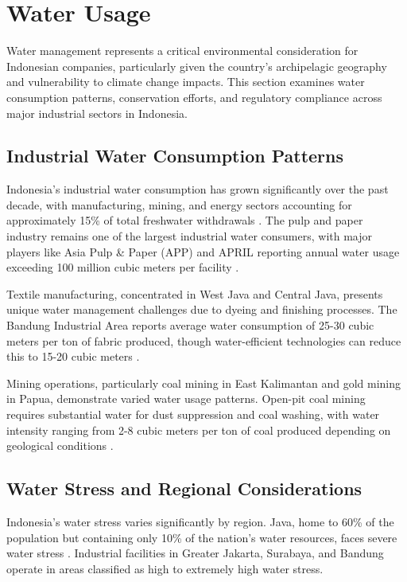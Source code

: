 \section{Water Usage}

Water management represents a critical environmental consideration for Indonesian companies, particularly given the country's archipelagic geography and vulnerability to climate change impacts. This section examines water consumption patterns, conservation efforts, and regulatory compliance across major industrial sectors in Indonesia.

\subsection{Industrial Water Consumption Patterns}

Indonesia's industrial water consumption has grown significantly over the past decade, with manufacturing, mining, and energy sectors accounting for approximately 15\% of total freshwater withdrawals \cite{ADB2020}. The pulp and paper industry remains one of the largest industrial water consumers, with major players like Asia Pulp \& Paper (APP) and APRIL reporting annual water usage exceeding 100 million cubic meters per facility \cite{APP2022}.

Textile manufacturing, concentrated in West Java and Central Java, presents unique water management challenges due to dyeing and finishing processes. The Bandung Industrial Area reports average water consumption of 25-30 cubic meters per ton of fabric produced, though water-efficient technologies can reduce this to 15-20 cubic meters \cite{BPS2021}.

Mining operations, particularly coal mining in East Kalimantan and gold mining in Papua, demonstrate varied water usage patterns. Open-pit coal mining requires substantial water for dust suppression and coal washing, with water intensity ranging from 2-8 cubic meters per ton of coal produced depending on geological conditions \cite{MiningIndonesia2023}.

\subsection{Water Stress and Regional Considerations}

Indonesia's water stress varies significantly by region. Java, home to 60\% of the population but containing only 10\% of the nation's water resources, faces severe water stress \cite{WorldResourcesInstitute2021}. Industrial facilities in Greater Jakarta, Surabaya, and Bandung operate in areas classified as high to extremely high water stress.

